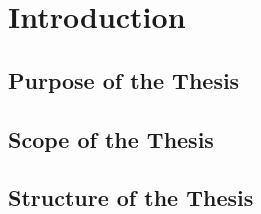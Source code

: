\chapter{Introduction}
\label{cha:introduction}


\section{Purpose of the Thesis}
\label{sec:purpose}



\section{Scope of the Thesis}
\label{sec:scope}




\section{Structure of the Thesis}
\label{sec:structure}

















